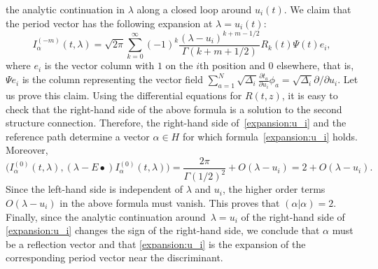 \documentclass[pdftex]{sigma}
\numberwithin{equation}{section}
\begin{document}
the analytic continuation in $\lambda$ along a closed loop around
$u_i(t)$. We claim that the period vector has the following expansion
at $\lambda=u_i(t)$:
\begin{equation}\label{expansion:u_i}
I^{(-m)}_\alpha(t,\lambda)=\sqrt{2\pi }
\sum_{k=0}^\infty (-1)^k
\frac{(\lambda-u_i)^{k+m-1/2}}{\Gamma(k+m+1/2)}
R_k(t) \Psi(t) e_i,
\end{equation}
where $e_i$ is the vector column with $1$ on the $i$th position and $0$
elsewhere, that is, $\Psi e_i$ is the column representing the vector field
$\sum_{a=1}^N \sqrt{\Delta_i} \frac{\partial t_a}{\partial u_i}
\phi_a = \sqrt{\Delta_i}\partial/\partial u_i$. Let us prove this
claim. Using the differential
equations for $R(t,z)$, it is easy to check that the right-hand side of the above
formula is a solution to the second structure connection. Therefore, the
right-hand side of~\eqref{expansion:u_i} and the reference path determine a vector
$\alpha\in H$ for which formula~\eqref{expansion:u_i} holds. Moreover,
\[
\big(I^{(0)}_\alpha(t,\lambda),(\lambda-E\bullet)
I^{(0)}_\alpha(t,\lambda)\big) =
\frac{2\pi}{\Gamma(1/2)^2} +O(\lambda-u_i)=
2+O(\lambda-u_i).
\]
Since the left-hand side is independent of $\lambda$ and $u_i$, the higher order
terms $O(\lambda-u_i)$ in the above formula must vanish. This proves
that $(\alpha|\alpha)=2$. Finally, since the analytic continuation around~$\lambda=u_i$ of the right-hand side of \eqref{expansion:u_i} changes the sign of
the right-hand side, we conclude that $\alpha$ must be a reflection vector and
that \eqref{expansion:u_i} is the expansion of the corresponding
period vector near the discriminant.
\end{document}
